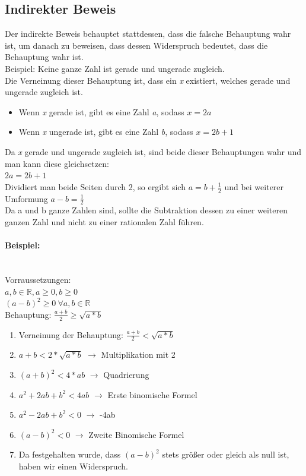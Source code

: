 \documentclass{article}
\newcommand{\paragraphlb}[1]{\paragraph{#1}\mbox{}\\}
\newcommand{\R}{\mathbb{R}}
\begin{document}
	\subsection{Indirekter Beweis}
	Der indirekte Beweis behauptet stattdessen, dass die falsche Behauptung wahr ist, um danach zu beweisen, dass dessen Widerspruch bedeutet, dass die Behauptung wahr ist. \\
	Beispiel: Keine ganze Zahl ist gerade und ungerade zugleich. \\
	Die Verneinung dieser Behauptung ist, dass ein \textit{x} existiert, welches gerade und ungerade zugleich ist. \\
	\begin{itemize}
		\item{Wenn \textit{x} gerade ist, gibt es eine Zahl \textit{a}, sodass $x=2a$}
		\item{Wenn \textit{x} ungerade ist, gibt es eine Zahl \textit{b}, sodass $x=2b+1$}
	\end{itemize}
	Da \textit{x} gerade und ungerade zugleich ist, sind beide dieser Behauptungen wahr und man kann diese gleichsetzen: \\
	$2a = 2b + 1$ \\
	Dividiert man beide Seiten durch 2, so ergibt sich $a = b + \frac{1}{2}$ und bei weiterer Umformung $ a - b = \frac{1}{2}$\\
	Da a und b ganze Zahlen sind, sollte die Subtraktion dessen zu einer weiteren ganzen Zahl und nicht zu einer rationalen Zahl führen.
	\paragraphlb{Beispiel:}
	Vorraussetzungen: \\
	$a,b \in\R, a\geq0, b\geq0$ \\
	$(a-b)^2\geq 0\ \forall a,b\in\R$ \\
	Behauptung: $\frac{a+b}{2} \geq \sqrt{a*b}$
	\begin{enumerate}
		\item{Verneinung der Behauptung: $\frac{a+b}{2} < \sqrt{a*b}$}
		\item{$a+b < 2*\sqrt{a*b}$ $\to$ Multiplikation mit 2}
		\item{$(a+b)^2 < 4*ab$ $\to$ Quadrierung}
		\item{$a^2+2ab+b^2<4ab$ $\to$ Erste binomische Formel}
		\item{$a^2-2ab+b^2 < 0$ $\to$ -4ab}
		\item{$(a-b)^2 < 0$ $\to$ Zweite Binomische Formel}
		\item{Da festgehalten wurde, dass $(a-b)^2$ stets größer oder gleich als null ist, haben wir einen Widerspruch.}
	\end{enumerate}
\end{document}
